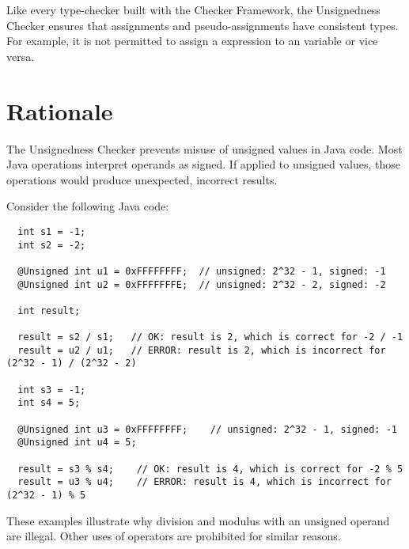 Like every type-checker built with the Checker Framework, the Unsignedness
Checker ensures that assignments and pseudo-assignments have consistent types.
For example, it is not permitted to assign a  expression to an
 variable or vice versa.


\section{Rationale\label{unsignedness-checker-rationale}}

The Unsignedness Checker prevents misuse of unsigned values in Java code.
Most Java operations interpret operands as signed.  If applied to unsigned
values, those operations would produce unexpected, incorrect results.

Consider the following Java code:

\begin{Verbatim}
  int s1 = -1;
  int s2 = -2;

  @Unsigned int u1 = 0xFFFFFFFF;  // unsigned: 2^32 - 1, signed: -1
  @Unsigned int u2 = 0xFFFFFFFE;  // unsigned: 2^32 - 2, signed: -2

  int result;

  result = s2 / s1;   // OK: result is 2, which is correct for -2 / -1
  result = u2 / u1;   // ERROR: result is 2, which is incorrect for (2^32 - 1) / (2^32 - 2)

  int s3 = -1;
  int s4 = 5;

  @Unsigned int u3 = 0xFFFFFFFF;    // unsigned: 2^32 - 1, signed: -1
  @Unsigned int u4 = 5;

  result = s3 % s4;    // OK: result is 4, which is correct for -2 % 5
  result = u3 % u4;    // ERROR: result is 4, which is incorrect for (2^32 - 1) % 5
\end{Verbatim}

These examples illustrate why division and modulus with an unsigned operand
are illegal.  Other uses of operators are prohibited for similar reasons.
